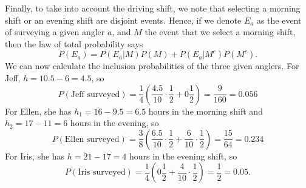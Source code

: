 \documentclass{homework}
\begin{document}
\begin{solution}
  Finally, to take into account the driving shift, we note that selecting
  a morning shift or an evening shift are disjoint events.  Hence, if we denote
  $E_{a}$ as the event of surveying a given angler $a$, and $M$ the event
  that we select a morning shift, then the law of total probability says
  $$
    P(E_a) = P(E_a|M)P(M) + P(E_a|M^c)P(M^c).
  $$
  We can now calculate the inclusion probabilities of the three given anglers. For Jeff, $h = 10.5 - 6 = 4.5$, so
  $$
    P(\text{Jeff surveyed}) = \frac 1{4} \left( \frac{4.5}{10}\cdot \frac 12 + 0 \frac12\right) = \frac{9}{160} = 0.056
  $$
  For Ellen, she has $h_1 = 16 - 9.5 = 6.5$ hours in the morning shift and $h_2 = 17-11 = 6$ hours in the evening, so
  $$
    P(\text{Ellen surveyed}) = \frac 3{8} \left( \frac{6.5}{10}\cdot \frac 12 + \frac6{10}\cdot \frac12\right) = \frac{15}{64} = 0.234 
  $$
  For Iris, she has $h = 21 - 17 = 4$ hours in the evening shift, so 
  $$
    P(\text{Iris surveyed}) = \frac 1{4} \left(0 \frac12  + \frac{4}{10}\cdot \frac 12\right) = \frac{1}2 = 0.05.
  $$

\end{solution}
\newpage
{}
\end{document}
